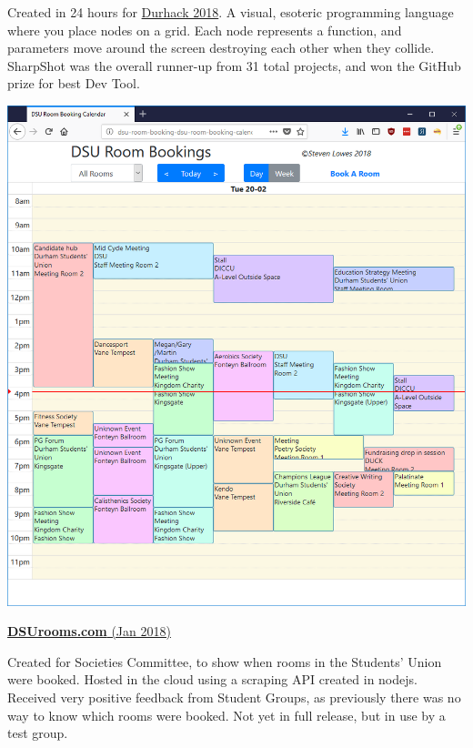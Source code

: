 \documentclass[hidelinks, 12pt, a4paper]{article}
\newcommand{\tech}[1]{
	\tcbox[skin=enhanced,nobeforeafter,colframe=black!20,size=fbox,height=15pt]{\footnotesize#1}
}
\begin{document}
\begin{minipage}{0.40\textwidth}
		Created in 24 hours for \href{http://www.durhack.com}{Durhack 2018}. A visual, esoteric programming language where you place nodes on a grid. Each node represents a function, and parameters move around the screen destroying each other when they collide. SharpShot was the overall runner-up from 31 total projects, and won the GitHub prize for best Dev Tool.
		
		\tech{Java} \tech{Kotlin} \tech{Javafx}
		
	\end{minipage}
	\hspace{0.06\textwidth}
	\begin{minipage}{0.40\textwidth}
		
		\begin{center}
			\href{http://www.dsurooms.com}{\includegraphics[width=0.9\linewidth]{dsurooms.png}}
		\end{center}
		\vspace{-12pt}
		\href{http://www.dsurooms.com}{\textbf{DSUrooms.com} (Jan 2018)}
		
		Created for Societies Committee, to show when rooms in the Students' Union were booked. Hosted in the cloud using a scraping API created in nodejs. Received very positive feedback from Student Groups, as previously there was no way to know which rooms were booked. Not yet in full release, but in use by a test group.
		

\end{minipage}
\end{document}
